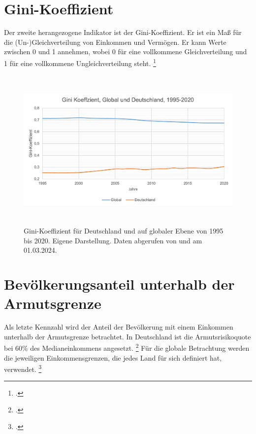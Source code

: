 \section{Gini-Koeffizient}

Der zweite herangezogene Indikator ist der Gini-Koeffizient. Er ist ein Ma{\ss} für die (Un-)Gleichverteilung von Einkommen und Vermögen. Er kann Werte zwischen 0 und 1 annehmen, wobei 0 für eine vollkommene Gleichverteilung und 1 für eine vollkommene Ungleichverteilung steht. \footcite[Vgl.][]{gini_definition_diw_2024}

\begin{figure}[H]
    \centering
    \includegraphics[height=8cm]{Bilder/Gini-Koeffizient2.png}
    \caption[Gini-Koeffizient, Deutschland und global, 1995-2020]{Gini-Koeffizient für Deutschland und auf globaler Ebene von 1995 bis 2020. Eigene Darstellung. Daten abgerufen von \cite[][, S.56 (global)]{wir_2022} und \cite[][(Deutschland)]{bmas_arb_gini_2020} am 01.03.2024.}
    \label{fig:iso_norm}
\end{figure}

\section{Bevölkerungsanteil unterhalb der Armutsgrenze}

Als letzte Kennzahl wird der Anteil der Bevölkerung mit einem Einkommen unterhalb der Armutsgrenze betrachtet. In Deutschland ist die Armutsrisikoquote bei 60\% des Medianeinkommens angesetzt. \footcite[Vgl.][]{bmas_arb_armutsrisikoquote_2023} Für die globale Betrachtung werden die jeweiligen Einkommensgrenzen, die jedes Land für sich definiert hat, verwendet. \footcite[Vgl.][]{wb_armutsquote_global_2022}

